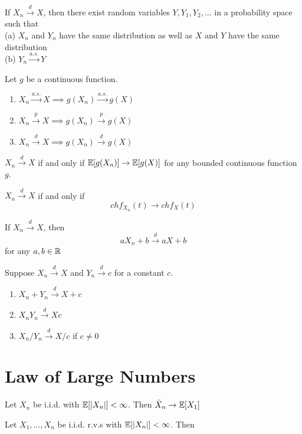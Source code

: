 \documentclass[11pt]{article}
\begin{document}
If $X_n \overset{d}{\longrightarrow} X$, then there exist random variables $Y, Y_1, Y_2, \hdots$ in a probability space such that \\
(a) $X_n$ and $Y_n$ have the same distribution as well as $X$ and $Y$ have the same distribution \\
(b) $Y_n \overset{a.s.}{\longrightarrow} Y$

Let $g$ be a continuous function.
\begin{enumerate}
	\item $X_n \overset{a.s.}{\longrightarrow} X \implies g(X_n) \overset{a.s.}{\longrightarrow} g(X)$
	\item $X_n \overset{p}{\longrightarrow} X \implies g(X_n) \overset{p}{\longrightarrow} g(X)$
	\item $X_n \overset{d}{\longrightarrow} X \implies g(X_n) \overset{d}{\longrightarrow} g(X)$
\end{enumerate}

\theorem
$X_n \overset{d}{\longrightarrow} X$ if and only if $\mathbb{E}[{g(X_n)}] \rightarrow \mathbb{E}[{g(X)}]$ for any bounded continuous function $g$.

\theorem
$X_n \overset{d}{\longrightarrow} X$ if and only if $$chf_{X_n}(t) \rightarrow chf_X(t)$$

\theorem
If $X_n \overset{d}{\longrightarrow} X$, then
$$aX_n + b \overset{d}{\longrightarrow} aX + b$$ for any $a,b \in \mathbb{R}$

Suppose $X_n \overset{d}{\longrightarrow} X$ and $Y_n \overset{d}{\longrightarrow} c$ for a constant $c$.
\begin{enumerate}
	\item $X_n + Y_n  \overset{d}{\longrightarrow} X + c$
	\item $X_nY_n  \overset{d}{\longrightarrow} Xc$
	\item $X_n/Y_n \overset{d}{\longrightarrow} X/c$ if $c \neq 0$
\end{enumerate}

\section{Law of Large Numbers}

Let $X_n$ be i.i.d. with $\mathbb{E}[{|X_n|}] < \infty$. Then $\bar{X}_n \rightarrow \mathbb{E}[{X_1}]$ 

Let $X_1, \hdots, X_n$ be i.i.d. r.v.s with $\mathbb{E}[{|X_n|}] < \infty$. Then 
\end{document}
